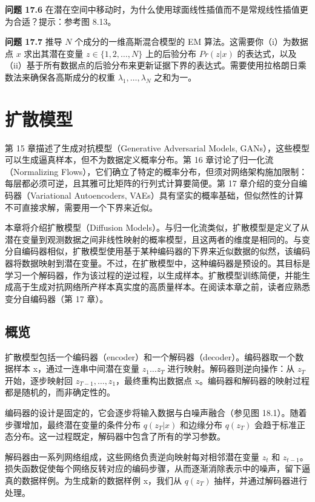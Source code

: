 \documentclass[lang=cn,newtx,10pt,scheme=chinese]{elegantbook}
\begin{document}
\textbf{问题 17.6} 在潜在空间中移动时，为什么使用球面线性插值而不是常规线性插值更为合适？提示：参考图 8.13。

\textbf{问题 17.7} 推导 \(N\) 个成分的一维高斯混合模型的 EM 算法。这需要你（i）为数据点 \(x\) 求出其潜在变量 \(z \in \{1, 2, \ldots, N\}\) 上的后验分布 \(Pr(z|x)\) 的表达式，以及（ii）基于所有数据点的后验分布来更新证据下界的表达式。需要使用拉格朗日乘数法来确保各高斯成分的权重 \(\lambda_1, \ldots, \lambda_N\) 之和为一。


\chapter{扩散模型}

第 15 章描述了生成对抗模型（Generative Adversarial Models, GANs），这些模型可以生成逼真样本，但不为数据定义概率分布。第 16 章讨论了归一化流（Normalizing Flows），它们确立了特定的概率分布，但须对网络架构施加限制：每层都必须可逆，且其雅可比矩阵的行列式计算要简便。第 17 章介绍的变分自编码器（Variational Autoencoders, VAEs）具有坚实的概率基础，但似然性的计算不可直接求解，需要用一个下界来近似。

本章将介绍扩散模型（Diffusion Models）。与归一化流类似，扩散模型是定义了从潜在变量到观测数据之间非线性映射的概率模型，且这两者的维度是相同的。与变分自编码器相似，扩散模型使用基于某种编码器的下界来近似数据的似然，该编码器将数据映射到潜在变量。不过，在扩散模型中，这种编码器是预设的。其目标是学习一个解码器，作为该过程的逆过程，以生成样本。扩散模型训练简便，并能生成高于生成对抗网络所产样本真实度的高质量样本。在阅读本章之前，读者应熟悉变分自编码器（第 17 章）。

\section{概览}
扩散模型包括一个编码器（encoder）和一个解码器（decoder）。编码器取一个数据样本 x，通过一连串中间潜在变量 \(z_1 \ldots z_T\) 进行映射。解码器则逆向操作：从 \(z_T\) 开始，逐步映射回 \(z_{T-1}, \ldots, z_1\)，最终重构出数据点 x。编码器和解码器的映射过程都是随机的，而非确定性的。

编码器的设计是固定的，它会逐步将输入数据与白噪声融合（参见图 18.1）。随着步骤增加，最终潜在变量的条件分布 \(q(z_T|x)\) 和边缘分布 \(q(z_T)\) 会趋于标准正态分布。这一过程既定，解码器中包含了所有的学习参数。

解码器由一系列网络组成，这些网络负责逆向映射每对相邻潜在变量 \(z_t\) 和 \(z_{t-1}\)。损失函数促使每个网络反转对应的编码步骤，从而逐渐消除表示中的噪声，留下逼真的数据样例。为生成新的数据样例 x，我们从 \(q(z_T)\) 抽样，并通过解码器进行处理。
\end{document}
